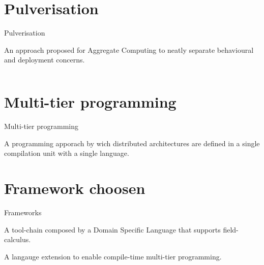 \documentclass[aspectratio=169]{beamer}
\begin{document}
\section{Pulverisation}
\begin{frame}{Pulverisation~\cite{DBLP:journals/fi/CasadeiPPVW20}}

{
    \begin{cardTiny}
      {
        \color{accent} An approach proposed for Aggregate Computing 
        to neatly separate behavioural and deployment concerns. 
      }
    \end{cardTiny}
    \begin{columns}
      \begin{column}{0.45\textwidth}
      \end{column}
      \begin{column}{0.38\textwidth}
      \end{column}
    \end{columns}
}
\end{frame}

\section{Multi-tier programming}

\begin{frame}{Multi-tier programming~\cite{DBLP:journals/csur/WeisenburgerWS20}}
  \begin{cardTiny}
  {
    \color{accent} A programming apporach by wich distributed architectures 
    are defined in a single compilation unit with a single language. 
  }
  \end{cardTiny}
  \centering
\end{frame}

\section{Framework choosen}
\begin{frame}{Frameworks}%

{
  \begin{card}
    A tool-chain composed by a Domain Specific Language that supports field-calculus.
  \end{card}
  \pause
  \begin{card}
    A langauge extension to enable compile-time multi-tier programming.
  \end{card}
}
\end{frame}
\end{document}
